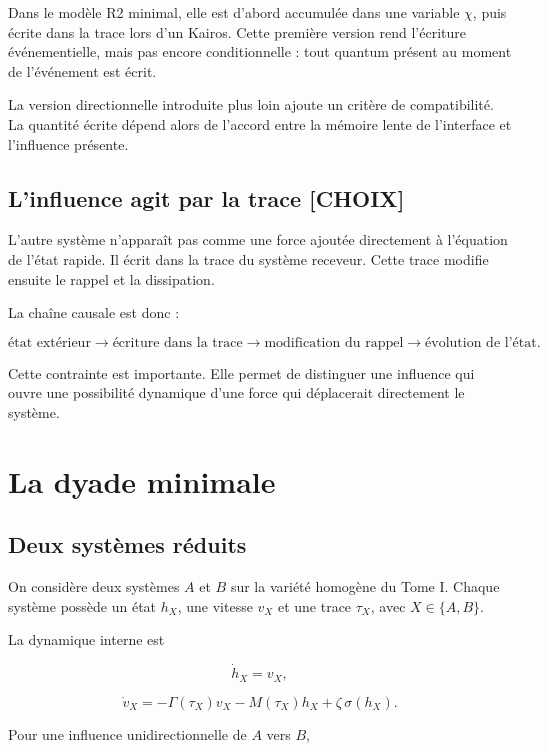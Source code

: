 Dans le modèle R2 minimal, elle est d'abord accumulée dans une variable
\(\chi\), puis écrite dans la trace lors d'un Kairos. Cette première
version rend l'écriture événementielle, mais pas encore conditionnelle :
tout quantum présent au moment de l'événement est écrit.

La version directionnelle introduite plus loin ajoute un critère de
compatibilité. La quantité écrite dépend alors de l'accord entre la
mémoire lente de l'interface et l'influence présente.

\section{L'influence agit par la trace {[}CHOIX{]}}\label{t2-linfluence-agit-par-la-trace-choix}

L'autre système n'apparaît pas comme une force ajoutée directement à
l'équation de l'état rapide. Il écrit dans la trace du système receveur.
Cette trace modifie ensuite le rappel et la dissipation.

La chaîne causale est donc :

\[
\text{état extérieur}
\longrightarrow
\text{écriture dans la trace}
\longrightarrow
\text{modification du rappel}
\longrightarrow
\text{évolution de l'état}.
\]

Cette contrainte est importante. Elle permet de distinguer une influence
qui ouvre une possibilité dynamique d'une force qui déplacerait
directement le système.

\chapter{La dyade minimale}\label{t2-la-dyade-minimale}

\section{Deux systèmes réduits}\label{t2-deux-systemes-reduits}

On considère deux systèmes \(A\) et \(B\) sur la variété homogène du
Tome I. Chaque système possède un état \(h_X\), une vitesse \(v_X\) et
une trace \(\tau_X\), avec \(X\in\{A,B\}\).

La dynamique interne est

\[
\dot h_X=v_X,
\]

\[
\dot v_X
=
-\Gamma(\tau_X)v_X
-
M(\tau_X)h_X
+
\zeta\,\sigma(h_X).
\]

Pour une influence unidirectionnelle de \(A\) vers \(B\),

